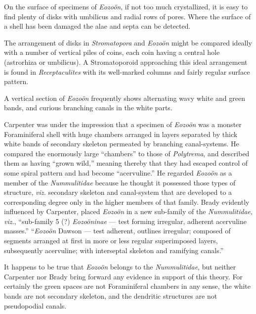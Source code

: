 \documentclass[a4paper, 12pt, oneside]{article}
\begin{document}
On the surface of specimens of \emph{Eozoön}, if not too much crystallized, it is easy to find plenty of disks with umbilicus and radial rows of pores. Where the surface of a shell has been damaged the alae and septa can be detected.

The arrangement of disks in \emph{Stromatopora} and \emph{Eozoön} might be compared ideally with a number of vertical piles of coins, each coin having a central hole (astrorhiza or umbilicus). A Stromatoporoid approaching this ideal arrangement is found in \emph{Receptaculites} with its well-marked columns and fairly regular surface pattern.

A vertical section of \emph{Eozoön} frequently shows alternating wavy white and green bands, and curious branching canals in the white parts.

Carpenter was under the impression that a specimen of \emph{Eozoön} was a monster Foraminiferal shell with huge chambers arranged in layers separated by thick white bands of secondary skeleton permeated by branching canal-systems. He compared the enormously large ``chambers'' to those of \emph{Polytrema}, and described them as having ``grown wild,'' meaning thereby that they had escaped control of some spiral pattern and had become ``acervuline.'' He regarded \emph{Eozoön} as a member of the \emph{Nummulitidae} because he thought it possessed those types of structure, \emph{viz.} secondary skeleton and canal-system that are developed to a corresponding degree only in the higher members of that family. Brady evidently influenced by Carpenter, placed \emph{Eozoön} in a new sub-family of the \emph{Nummulitidae}, \emph{viz.}, ``sub-family 5 (?) \emph{Eozoöninae} --- test forming irregular, adherent acervuline masses.'' ``\emph{Eozoön} Dawson --- test adherent, outlines irregular; composed of segments arranged at first in more or less regular superimposed layers, subsequently acervuline; with interseptal skeleton and ramifying canals.''

It happens to be true that \emph{Eozoön} belongs to the \emph{Nummulitidae}, but neither Carpenter nor Brady bring forward any evidence in support of this theory. For certainly the green spaces are not Foraminiferal chambers in any sense, the white bands are not secondary skeleton, and the dendritic structures are not pseudopodial canals.
\end{document}
